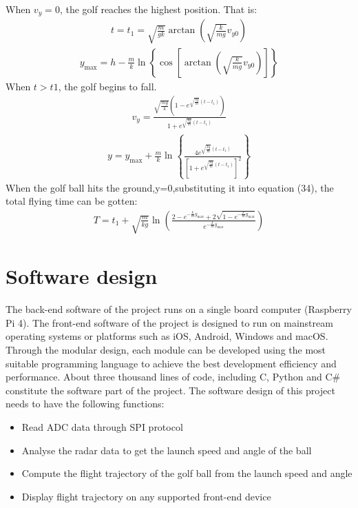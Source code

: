 When $v_{y}=0$, the golf reaches the highest position. That is:
\begin{align}
    t=t_{1}=\sqrt{\frac{m}{g k}} \arctan \left(\sqrt{\frac{k}{m g}} v_{y 0}\right)
\end{align}
\begin{align}
    y_{\max }=h-\frac{m}{k} \ln \left\{\cos \left[\arctan \left(\sqrt{\frac{k}{m g}} v_{y 0}\right)\right]\right\}
\end{align}
When $t>t 1$, the golf begins to fall.
\begin{align}
    v_{y}=\frac{\sqrt{\frac{m g}{k}}\left(1-e^{\sqrt{\frac{k g}{m}}\left(t-t_{1}\right)}\right)}{1+e^{\sqrt{\frac{k g}{m}}\left(t-t_{1}\right)}}
\end{align}
\begin{align}
    y=y_{\max }+\frac{m}{k} \ln \left\{\frac{4 e^{\sqrt{\frac{k g}{m}}\left(t-t_{1}\right)}}{\left[1+e^{\sqrt{\frac{k g}{m}}\left(t-t_{1}\right)}\right]^{2}}\right\}
\end{align}
When the golf ball hits the ground,y=0,substituting it into equation (34), the total flying time can be gotten:
\begin{align}
    T=t_{1}+\sqrt{\frac{m}{k g}} \ln \left(\frac{2-e^{-\frac{k}{m} y_{\max }}+2 \sqrt{1-e^{-\frac{k}{m} y_{\max }}}}{e^{-\frac{k}{m} y_{\max }}}\right)
\end{align}

\newpage
\section{Software design}
The back-end software of the project runs on a single board computer (Raspberry Pi 4). The front-end software of the project is designed to run on mainstream operating systems or platforms such as iOS, Android, Windows and macOS. Through the modular design, each module can be developed using the most suitable programming language to achieve the best development efficiency and performance. About three thousand lines of code, including C, Python and C\# constitute the software part of the project. The software design of this project needs to have the following functions: 
\begin{itemize}[noitemsep,topsep=0pt]
   \item Read ADC data through SPI protocol
   \item Analyse the radar data to get the launch speed and angle of the ball
   \item Compute the flight trajectory of the golf ball from the launch speed and angle
   \item Display flight trajectory on any supported front-end device
\end{itemize}
   
